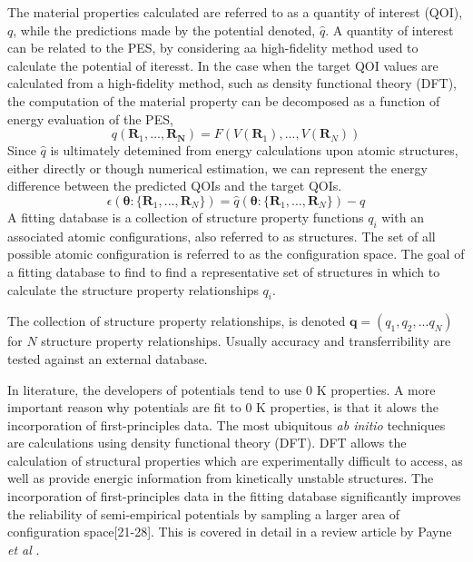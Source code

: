 The material properties calculated are referred to as a quantity of interest (QOI), $q$, while the predictions made by the potential denoted, $\hat{q}$.
A quantity of interest can be related to the PES, by considering aa high-fidelity method used to calculate the potential of iteresst.
In the case when the target QOI values are calculated from a high-fidelity method, such as density functional theory (DFT), the computation of the material property can be decomposed as a function of energy evaluation of the PES,
\begin{equation}
	q(\bm{R}_1,...,\bm{R_N}) = F(V(\bm{R}_1),...,V(\bm{R}_N))
\end{equation}
Since $\hat{q}$ is ultimately detemined from energy calculations upon atomic structures, either directly or though numerical estimation, we can represent the energy difference between the predicted QOIs and the target QOIs.
\begin{equation}
	\epsilon(\bm{\theta}:\{\bm{R}_1,...,\bm{R}_N\})=\hat{q}(\bm{\theta}:\{\bm{R}_1,...,\bm{R}_N\})-q
\end{equation}
A fitting database is a collection of structure property functions $q_i$ with an associated atomic configurations, also referred to as structures.
The set of all possible atomic configuration is referred to as the configuration space.
The goal of a fitting database to find to find a representative set of structures in which to calculate the structure property relationships $q_i$.

  The collection of structure property relationships, is denoted $\bm{q}=(q_1,q_2,...q_N)$ for $N$ structure property relationships.  Usually accuracy and transferribility are tested against an external database.

In literature, the developers of potentials tend to use $0$ K properties.  A more important reason why potentials are fit to $0$ K properties, is that it alows the incorporation of first-principles data.
The most ubiquitous \emph{ab initio} techniques are calculations using density functional theory (DFT).
DFT allows the calculation of structural properties which are experimentally difficult to access, as well as provide energic information from kinetically unstable structures.
The incorporation of first-principles data in the fitting database significantly improves the reliability of semi-empirical potentials by sampling a larger area of configuration space[21-28].
This is covered in detail in a review article by Payne \emph{et al} \cite{payne1996_dft_database}.

